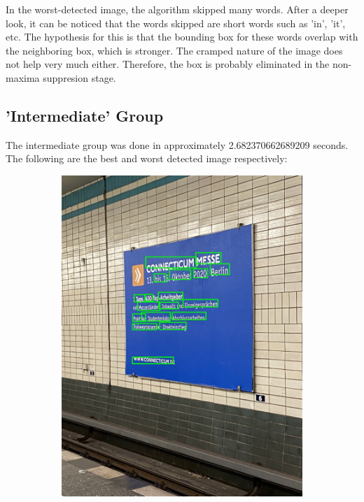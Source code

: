 \documentclass[10pt, a4paper]{article}
\begin{document}
In the worst-detected image, the algorithm skipped many words. After a deeper look, it can be noticed that the words skipped are short words such as 'in', 'it', etc. The hypothesis for this is that the bounding box for these words overlap with the neighboring box, which is stronger. The cramped nature of the image does not help very much either. Therefore, the box is probably eliminated in the non-maxima suppresion stage.
\subsection{'Intermediate' Group} %
\label{sub:inter}
The intermediate group was done in approximately 2.682370662689209 seconds. The following are the best and worst detected image respectively:
\begin{figure}[h!]
	\centering
	\begin{subfigure}[b]{0.4\linewidth}
		\includegraphics[width=\linewidth]{jupyter/results/inter/sample_output_3.jpeg}

\end{subfigure}
\end{figure}
\end{document}
